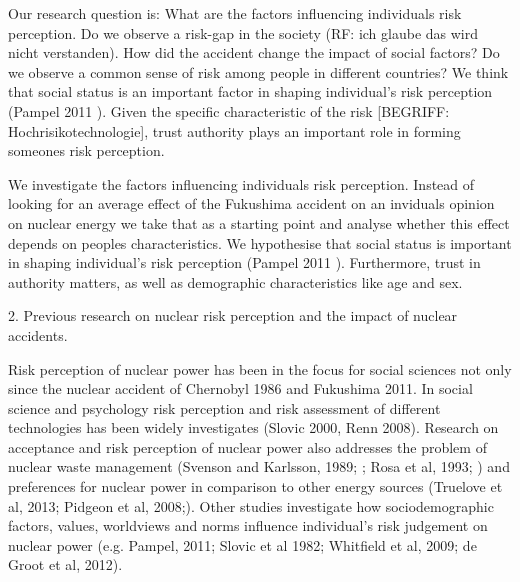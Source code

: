 Our research question is: What are the factors influencing individuals risk perception. Do we observe a risk-gap in the society (RF: ich glaube das wird nicht verstanden). How did the accident change the impact of social factors? Do we observe a common sense of risk among people in different countries? We think that social status is an important factor in shaping individual's risk perception (Pampel 2011 \citep{Pampel:2011cx}). Given the specific characteristic of the risk [BEGRIFF: Hochrisikotechnologie], trust authority plays an important role in forming someones risk perception. 

We investigate the factors influencing individuals risk perception. Instead of looking for an average effect of the Fukushima accident on an inviduals opinion on nuclear energy we take that as a starting point and analyse whether this effect depends on peoples characteristics. We hypothesise that social status is important in shaping individual's risk perception (Pampel 2011 \citep{Pampel:2011cx}). Furthermore, trust in authority matters, as well as demographic characteristics like age and sex.


%


2. Previous research on nuclear risk perception and the impact of nuclear accidents.

Risk perception  of nuclear power has been in the focus for social sciences not only since the nuclear accident of Chernobyl 1986 and Fukushima 2011. In social science and psychology risk perception and risk assessment of different technologies has been widely investigates (Slovic 2000, Renn 2008). Research on acceptance and risk perception of nuclear power also addresses the problem of nuclear waste management (Svenson and Karlsson, 1989; \citep{Svenson:1989up}; Rosa et al, 1993;  ) and preferences for nuclear power in comparison to other energy sources (Truelove et al, 2013; Pidgeon et al, 2008;). Other studies investigate how sociodemographic factors, values, worldviews and norms influence individual's risk judgement on nuclear power (e.g. Pampel, 2011; Slovic et al 1982; Whitfield et al, 2009; de Groot et al, 2012). 
 

